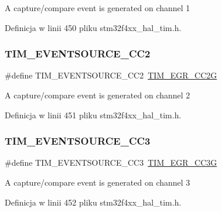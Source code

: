 A capture/compare event is generated on channel 1 

Definicja w linii 450 pliku stm32f4xx\+\_\+hal\+\_\+tim.\+h.

\mbox{\label{group___t_i_m___event___source_ga12e3a98c601f4f288354ac2538050e6b}} 
\subsubsection{\texorpdfstring{T\+I\+M\+\_\+\+E\+V\+E\+N\+T\+S\+O\+U\+R\+C\+E\+\_\+\+C\+C2}{TIM\_EVENTSOURCE\_CC2}}
{\footnotesize\ttfamily \#define T\+I\+M\+\_\+\+E\+V\+E\+N\+T\+S\+O\+U\+R\+C\+E\+\_\+\+C\+C2~\hyperlink{group___peripheral___registers___bits___definition_ga5423de00e86aeb8a4657a509af485055}{T\+I\+M\+\_\+\+E\+G\+R\+\_\+\+C\+C2G}}

A capture/compare event is generated on channel 2 

Definicja w linii 451 pliku stm32f4xx\+\_\+hal\+\_\+tim.\+h.

\mbox{\label{group___t_i_m___event___source_ga1c2faf942ab525b44299ddd0a6d848e4}} 
\subsubsection{\texorpdfstring{T\+I\+M\+\_\+\+E\+V\+E\+N\+T\+S\+O\+U\+R\+C\+E\+\_\+\+C\+C3}{TIM\_EVENTSOURCE\_CC3}}
{\footnotesize\ttfamily \#define T\+I\+M\+\_\+\+E\+V\+E\+N\+T\+S\+O\+U\+R\+C\+E\+\_\+\+C\+C3~\hyperlink{group___peripheral___registers___bits___definition_ga064d2030abccc099ded418fd81d6aa07}{T\+I\+M\+\_\+\+E\+G\+R\+\_\+\+C\+C3G}}

A capture/compare event is generated on channel 3 

Definicja w linii 452 pliku stm32f4xx\+\_\+hal\+\_\+tim.\+h.

